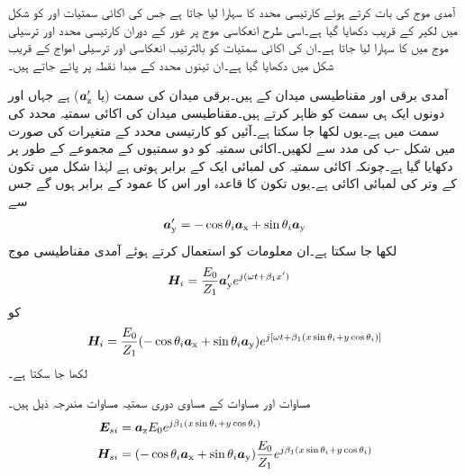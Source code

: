 آمدی موج کی بات کرتے ہوئے کارتیسی محدد  کا سہارا لیا جاتا ہے  جس کی اکائی سمتیات  اور  کو  شکل  میں لکیر  کے قریب دکھایا گیا ہے۔اسی طرح  انعکاسی موج پر غور کے دوران  کارتیسی محدد  اور ترسیلی موج میں  کا سہارا لیا جاتا ہے۔ان کی اکائی سمتیات کو بالترتیب  انعکاسی اور ترسیلی امواج کے قریب شکل  میں دکھایا گیا ہے۔ان تینوں محدد کے مبدا نقطہ  پر پائے جاتے ہیں۔

آمدی برقی اور مقناطیسی میدان  کے   ہیں۔برقی میدان کی سمت  (یا ${\boldsymbol{a}}_{\textup{z}}'$) ہے جہاں  اور  دونوں ایک ہی سمت کو ظاہر کرتے ہیں۔مقناطیسی میدان   کی اکائی سمتیہ  محدد   کی سمت میں ہے۔یوں   لکھا جا سکتا ہے۔آئیں  کو کارتیسی محدد  کے متغیرات کی صورت میں شکل -ب کی مدد سے لکھیں۔اکائی سمتیہ  کو دو سمتیوں کے مجموعے کے طور پر دکھایا گیا ہے۔چونکہ اکائی سمتیہ کی لمبائی ایک کے برابر ہوتی ہے لہٰذا شکل میں تکون کے وتر کی لمبائی اکائی ہے۔یوں  تکون کا قاعدہ  اور اس کا عمود  کے برابر ہوں گے جس سے
\begin{align}\label{مساوات_ترچھی_اکائی_وائے_ڈیش}
{\boldsymbol{a}}_{\textup{y}}'=-\cos \theta_i {\boldsymbol{a}}_{\textup{x}}+\sin \theta_i {\boldsymbol{a}}_{\textup{y}}
\end{align} 
لکھا جا سکتا ہے۔ان معلومات کو استعمال کرتے ہوئے آمدی مقناطیسی موج
\begin{align*}
{\ensuremath{{\boldsymbol{H}}}}_i&=\frac{E_0}{Z_1} {\boldsymbol{a}}_{\textup{y}}' e^{j(\omega t +\beta_1 x')}
\end{align*}
کو
\begin{align}\label{مساوات_ترچھی_عمودی_برقی_میں_مقناطیسی_آمدی}
{\ensuremath{{\boldsymbol{H}}}}_i=\frac{E_0}{Z_1} (-\cos \theta_i {\boldsymbol{a}}_{\textup{x}}+\sin \theta_i {\boldsymbol{a}}_{\textup{y}}) e^{j[\omega t +\beta_1 (x\sin \theta_i +y \cos \theta_i)]}
\end{align}
لکھا جا سکتا ہے۔

مساوات  اور مساوات  کے مساوی دوری سمتیہ  مساوات مندرجہ ذیل ہیں۔
\begin{align}
{\ensuremath{{\boldsymbol{E}}}}_{si} & = {\boldsymbol{a}}_{\textup{z}} E_0 e^{j\beta_1 (x\sin \theta_i +y \cos \theta_i)} \label{مساوات_ترچھی_آمدی_برقی_میدان_دوری_سمتی}\\
{{\boldsymbol{H}}}_{si} & = (-\cos \theta_i {\boldsymbol{a}}_{\textup{x}}+\sin \theta_i {\boldsymbol{a}}_{\textup{y}})\frac{E_0}{Z_1} e^{j\beta_1 (x\sin \theta_i +y \cos \theta_i)} \label{مساوات_ترچھی_آمدی_مقناطیسی_میدان_دوری_سمتی}
\end{align}

